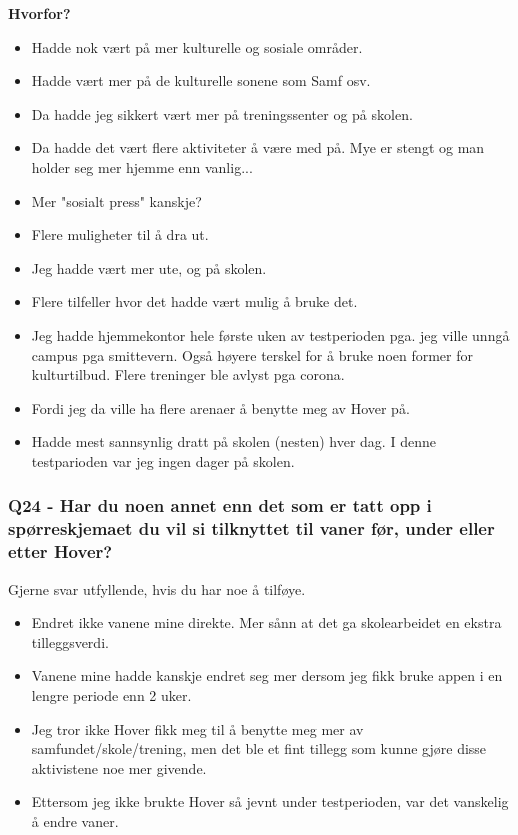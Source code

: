 \textbf{Hvorfor?}
\begin{itemize}[noitemsep]
	\item Hadde nok vært på mer kulturelle og sosiale områder.
	\item Hadde vært mer på de kulturelle sonene som Samf osv.
	\item Da hadde jeg sikkert vært mer på treningssenter og på skolen.
	\item Da hadde det vært flere aktiviteter å være med på. Mye er stengt og man holder seg mer hjemme enn vanlig...
	\item Mer "sosialt press" kanskje?
	\item Flere muligheter til å dra ut.
	\item Jeg hadde vært mer ute, og på skolen.
	\item Flere tilfeller hvor det hadde vært mulig å bruke det.
	\item Jeg hadde hjemmekontor hele første uken av testperioden pga. jeg ville unngå campus pga smittevern. Også høyere terskel for å bruke noen former for kulturtilbud. Flere treninger ble avlyst pga corona.
	\item Fordi jeg da ville ha flere arenaer å benytte meg av Hover på.
	\item Hadde mest sannsynlig dratt på skolen (nesten) hver dag. I denne testparioden var jeg ingen dager på skolen.
\end{itemize}

\subsubsection*{Q24 - Har du noen annet enn det som er tatt opp i spørreskjemaet du vil si tilknyttet til vaner før, under eller etter Hover?}

Gjerne svar utfyllende, hvis du har noe å tilføye.
\begin{itemize}[noitemsep]
	\item Endret ikke vanene mine direkte. Mer sånn at det ga skolearbeidet en ekstra tilleggsverdi.
	\item Vanene mine hadde kanskje endret seg mer dersom jeg fikk bruke appen i en lengre periode enn 2 uker.
	\item Jeg tror ikke Hover fikk meg til å benytte meg mer av samfundet/skole/trening, men det ble et fint tillegg som kunne gjøre disse aktivistene noe mer givende.
	\item Ettersom jeg ikke brukte Hover så jevnt under testperioden, var det vanskelig å endre vaner. 
\end{itemize}


